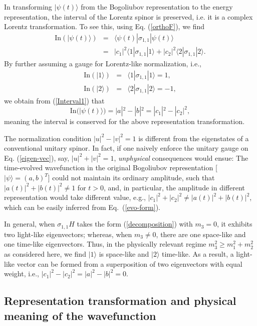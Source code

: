 \documentclass[pra,epsfig,rotate,superscriptaddress,showpacs]{revtex4}
\begin{document}
In transforming $|\psi(t)\rangle$ from the Bogoliubov representation to the energy representation, the interval of the Lorentz spinor is preserved, i.e. it is a complex Lorentz transformation. To see this, using Eq. (\ref{orthoF}), we find
\begin{eqnarray} \label{Interval1}
{\text {In}}(|\psi(t)\rangle)&=&\langle\psi(t)|\sigma_{1,1}|\psi(t)\rangle \\
&=&|c_1|^2 \langle 1|\sigma_{1,1}|1\rangle+|c_2|^2 \langle 2|\sigma_{1,1}|2\rangle.
\end{eqnarray}
By further assuming a gauge for Lorentz-like normalization, i.e.,
\begin{eqnarray} \label{normalization} \nonumber
{\text {In}}(|1\rangle)&=&\langle1|\sigma_{1,1}|1\rangle=1, \\  {\text {In}}(|2\rangle)&=&\langle2|\sigma_{1,1}|2\rangle=-1,
\end{eqnarray}
we obtain from (\ref{Interval1}) that
\begin{equation}
\label{con2}
{\text {In}}(|\psi(t)\rangle)=|a|^2-|b|^2=|c_1|^2-|c_2|^2,
\end{equation}
meaning the interval is conserved for the above representation transformation.

The normalization condition $|u|^2-|v|^2=1$ is different from  the eigenstates of a conventional unitary spinor. In fact, if one naively enforce the unitary gauge on Eq. (\ref{eigen-vec}), say, $|u|^2+|v|^2=1$, \textit{unphysical} consequences would ensue: The time-evolved wavefunction in the original Bogoliubov representation [$|\psi\rangle=(a,b)^T$] could not maintain its ordinary amplitude, such that $|a(t)|^2+|b(t)|^2\neq1$ for $t>0$, and, in particular, the amplitude in different representation would take different value, e.g., $|c_1|^2+|c_2|^2\neq|a(t)|^2+|b(t)|^2$, which can be easily inferred from Eq.~(\ref{evo-form}).

In general, when $\sigma_{1,1}H$ takes the form (\ref{decomposition}) with $m_3=0$, it exhibits two light-like eigenvectors; whereas, when $m_3\neq0$, there are one space-like and one time-like eigenvectors. Thus, in the physically relevant regime $m_3^2\geq m_1^2+m_2^2$ as considered here, we find $|1\rangle$ is space-like and $|2\rangle$ time-like. As a result,  a light-like vector can be formed from a superposition of two eigenvectors with equal weight, i.e., $|c_1|^2-|c_2|^2=|a|^2-|b|^2=0$.



\subsection{Representation transformation and physical meaning of the wavefunction}
\end{document}

